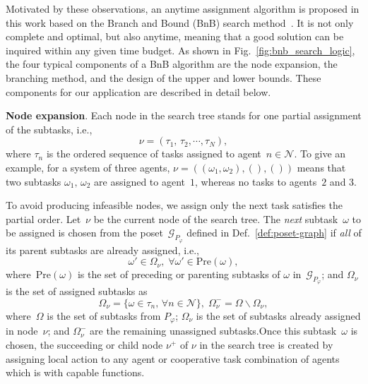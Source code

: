 Motivated by these observations, an anytime assignment
algorithm is proposed in this work based on the Branch and Bound (BnB) search
method~\cite{lawler1966branch, morrison2016branch}.
It is not only complete and optimal, but also anytime, meaning that a good
solution can be inquired within any given time budget.
As shown in Fig.~\ref{fig:bnb_search_logic},
the four typical components of a BnB
algorithm are the node expansion, the branching method,
and the design of the upper and lower bounds.
These components for our application are described in detail below.


\textbf{Node expansion}.
Each node in the search tree stands for one partial assignment of the
subtasks, i.e.,
\begin{equation}\label{eq:node}
\nu = (\tau_1,\,\tau_2,\cdots,\tau_N),
\end{equation}
where $\tau_n$ is the ordered sequence of tasks assigned to agent~$n\in \mathcal{N}$.
To give an example, for a system of three agents,
$\nu=((\omega_1,\omega_2),(),())$ means that two subtasks
$\omega_1,\, \omega_2$ are assigned to agent~$1$,
whereas no tasks to agents~$2$ and $3$.


To avoid producing infeasible nodes, we assign only the next task satisfies
the partial order. Let~$\nu$ be the current node of the search tree.
The \emph{next} subtask~$\omega$ to be assigned is chosen from the
poset~$\mathcal{G}_{P_\varphi}$ defined in Def.~\ref{def:poset-graph}
if \emph{all} of its parent subtasks are already assigned, i.e.,
\begin{equation}\label{eq:next-task}
\omega' \in \Omega_\nu, \; \forall \omega' \in \text{Pre}(\omega),
\end{equation}
where~$\text{Pre}(\omega)$ is the set of preceding or parenting subtasks of $\omega$ in~$\mathcal{G}_{P_\varphi}$;
and $\Omega_\nu$ is the set of assigned subtasks as
\begin{equation}\label{eq:node-tasks}
\Omega_{\nu}=\{\omega\in\tau_n,\,\forall n\in \mathcal{N}\},
\;\Omega^-_{\nu} = \Omega\backslash \Omega_{\nu},
\end{equation}
where~$\Omega$ is the set of subtasks from $P_\varphi$;
$\Omega_{\nu}$ is the set of subtasks already assigned in node~$\nu$;
and $\Omega^-_{\nu}$ are the remaining unassigned subtasks.Once this 
subtask~$\omega$ is chosen, the succeeding or child node $\nu^+$
of $\nu$ in the search tree is created by assigning local action to any agent or 
cooperative task combination of agents which is with capable functions. 

